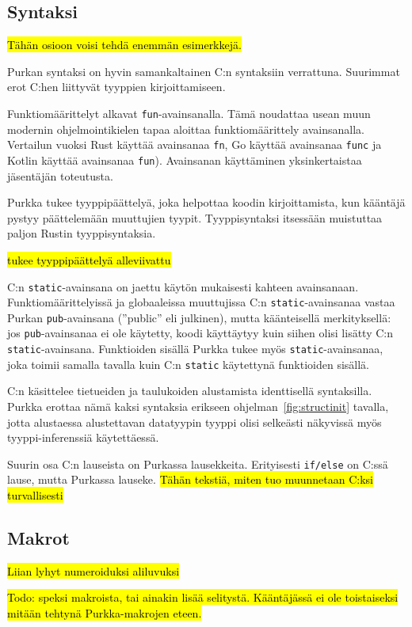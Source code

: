 \subsection{Syntaksi}

\hl{Tähän osioon voisi tehdä enemmän esimerkkejä.}

Purkan syntaksi on hyvin samankaltainen C:n syntaksiin verrattuna. Suurimmat
erot C:hen liittyvät tyyppien kirjoittamiseen.

Funktiomäärittelyt alkavat \texttt{fun}-avainsanalla. Tämä noudattaa usean muun
modernin ohjelmointikielen tapaa aloittaa funktiomäärittely avainsanalla.
Vertailun vuoksi Rust käyttää avainsanaa \texttt{fn}, Go käyttää avainsanaa
\texttt{func} ja Kotlin käyttää avainsanaa \texttt{fun}). Avainsanan
käyttäminen yksinkertaistaa jäsentäjän toteutusta.

Purkka tukee tyyppipäättelyä, joka helpottaa koodin kirjoittamista, kun
kääntäjä pystyy päättelemään muuttujien tyypit. Tyyppisyntaksi itsessään
muistuttaa paljon Rustin tyyppisyntaksia.

\hl{tukee tyyppipäättelyä alleviivattu}

C:n \texttt{static}-avainsana on jaettu käytön mukaisesti kahteen avainsanaan.
Funktiomäärittelyissä ja globaaleissa muuttujissa C:n
\texttt{static}-avainsanaa vastaa Purkan \texttt{pub}-avainsana (''public'' eli
julkinen), mutta käänteisellä merkityksellä: jos \texttt{pub}-avainsanaa ei ole
käytetty, koodi käyttäytyy kuin siihen olisi lisätty C:n
\texttt{static}-avainsana. Funktioiden sisällä Purkka tukee myös
\texttt{static}-avainsanaa, joka toimii samalla tavalla kuin C:n
\texttt{static} käytettynä funktioiden sisällä.

C:n käsittelee tietueiden ja taulukoiden alustamista identtisellä syntaksilla.
Purkka erottaa nämä kaksi syntaksia erikseen ohjelman~\ref{fig:structinit}
tavalla, jotta alustaessa alustettavan datatyypin tyyppi olisi selkeästi
näkyvissä myös tyyppi-inferenssiä käytettäessä.

Suurin osa C:n lauseista on Purkassa lausekkeita. Erityisesti \texttt{if/else}
on C:ssä lause, mutta Purkassa lauseke. \hl{Tähän tekstiä, miten tuo muunnetaan
C:ksi turvallisesti}

\subsection{Makrot}

\hl{Liian lyhyt numeroiduksi aliluvuksi}

\hl{Todo: speksi makroista, tai ainakin lisää selitystä. Kääntäjässä ei ole
toistaiseksi mitään tehtynä Purkka-makrojen eteen.}

